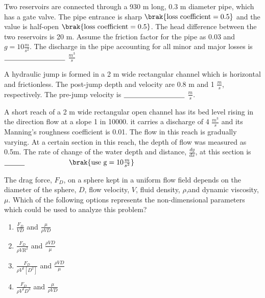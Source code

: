 \iffalse
\chapter{2015}
\author{AI24BTECH11011}
\section{ce}
\fi


\item Two reservoirs are connected through a 930 m long, 0.3 m diameter pipe, which has a gate valve. The pipe entrance is sharp $\brak{\text{loss coefficient} = 0.5}$ and the value is half-open $\brak{\text{loss coefficient} = 0.5}$. The head difference between the two reservoirs is 20 m. Assume the friction factor for the pipe as 0.03 and $g = 10 \frac{m}{s^2}$. The discharge in the pipe accounting for all minor and major losses is $\makebox[3cm][l]{\underline{\hspace{3cm}}}$ $\frac{m^3}{s}$

\item A hydraulic jump is formed in a 2 m wide rectangular channel which is horizontal and frictionless. The post-jump depth and velocity are 0.8 m and 1 $\frac{m}{s}$, respectively. The pre-jump velocity is $\makebox[3cm][l]{\underline{\hspace{3cm}}}$ $\frac{m}{s}$. 

\item A short reach of a 2 m wide rectangular open channel has its bed level rising in the direction flow at a slope 1 in 10000. it carries a discharge of 4 $\frac{m^3}{s}$ and its Manning's roughness coefficient is 0.01. The flow in this reach is gradually varying. At a certain section in this reach, the depth of flow was measured as 0.5m. The rate of change of the water depth and distance, $\frac{dy}{dx}$, at this section is $\makebox[3cm][l]{\underline{\hspace{1cm}}}$ $\brak{\text{use g} = 10 \frac{m}{s^2}}$

\item The drag force, $F_D$, on a sphere kept in a uniform flow field depends on the diameter of the sphere, $D$, flow velocity, $V$, fluid density, $\rho$,and dynamic viscosity, $\mu$. Which of the following options represents the non-dimensional parameters which could be used to analyze this problem?
\begin{enumerate}
    \item $\frac{F_D}{VD}$ and $\frac{\mu}{{\rho}VD}$
    \item $\frac{F_D}{{\rho}V{R^2}}$ and $\frac{{\rho}VD}{\mu}$
    \item $\frac{F_D}{{\rho}{V^2}[D^2]}$ and $\frac{{\rho}VD}{\mu}$
    \item $\frac{F_D}{{\rho}{V^3}{D^3}}$ and $\frac{\mu}{{\rho}VD}$

\end{enumerate}

